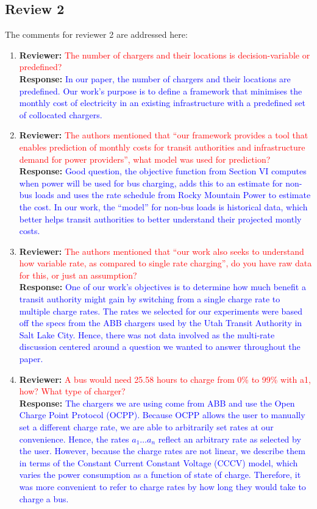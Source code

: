 \documentclass{article}
\newcommand\formatfeedback[2]
{%
	\textbf{Reviewer:} \textcolor{red}{#1} 
	\\[0.1in] \textbf{Response:} \textcolor{blue}{#2}
}
\begin{document}
\subsection*{Review 2}
The comments for reviewer 2 are addressed here:
\begin{enumerate}
	\item \formatfeedback{The number of chargers and their locations is decision-variable or predefined?}%
			     {In our paper, the number of chargers and their locations are predefined. Our work's purpose is to define a framework that minimises the monthly cost of electricity in an existing infrastructure with a predefined set of collocated chargers.} 
	\item \formatfeedback{The authors mentioned that “our framework provides a tool that enables prediction of monthly costs for transit authorities and infrastructure demand for power providers”, what model was used for prediction?}%
			     {Good question, the objective function from Section VI computes when power will be used for bus charging, adds this to an estimate for non-bus loads and uses the rate schedule from Rocky Mountain Power to estimate the cost. In our work, the ``model'' for non-bus loads is historical data, which better helps transit authorities to better understand their projected montly costs.} 
	\item \formatfeedback{The authors mentioned that “our work also seeks to understand how variable rate, as compared to single rate charging”, do you have raw data for this, or just an assumption?}%
			     {One of our work's objectives is to determine how much benefit a transit authority might gain by switching from a single charge rate to multiple charge rates. The rates we selected for our experiments were based off the specs from the ABB chargers used by the Utah Transit Authority in Salt Lake City. Hence, there was not data involved as the multi-rate discussion centered around a question we wanted to answer throughout the paper.} 
	\item \formatfeedback{A bus would need 25.58 hours to charge from 0\% to 99\% with a1, how? What type of charger?}%
		{The chargers we are using come from ABB and use the Open Charge Point Protocol (OCPP). Because OCPP allows the user to manually set a different charge rate, we are able to arbitrarily set rates at our convenience. Hence, the rates $a_1 \hdots a_n$ reflect an arbitrary rate as selected by the user. However, because the charge rates are not linear, we describe them in terms of the Constant Current Constant Voltage (CCCV) model, which varies the power consumption as a function of state of charge. Therefore, it was more convenient to refer to charge rates by how long they would take to charge a bus.} 

\end{enumerate}
\end{document}
